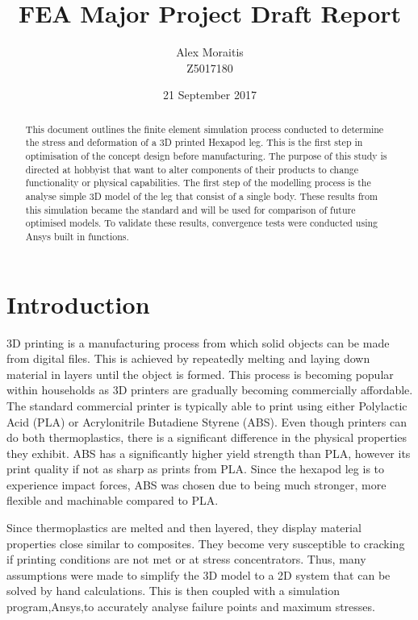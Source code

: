 \documentclass[a4paper]{article}
\title{FEA Major Project Draft Report}
\author{Alex Moraitis\\Z5017180}
\date{21 September 2017}
\begin{document}
\maketitle

\begin{abstract}
This document outlines the finite element simulation process conducted to determine the stress and deformation of a 3D printed Hexapod leg. This is the first step in optimisation of the concept design before manufacturing. The purpose of this study is directed at hobbyist that want to alter components of their products to change functionality or physical capabilities. The first step of the modelling process is the analyse simple 3D model of the leg that consist of a single body. These results from this simulation became the standard and will be used for comparison of future optimised models. To validate these results, convergence tests were conducted using Ansys built in functions.
\end{abstract}

\newpage
\tableofcontents
\newpage

\section{Introduction}
3D printing is a manufacturing process from which solid objects can be made from digital files. This is achieved by repeatedly melting and laying down material in layers until the object is formed. This process is becoming popular within households as 3D printers are gradually becoming commercially affordable. The standard commercial printer is typically able to print using either Polylactic Acid (PLA) or Acrylonitrile Butadiene Styrene (ABS). Even though printers can do both thermoplastics, there is a significant difference in the physical properties they exhibit. ABS has a  significantly higher yield strength than PLA, however its print quality if not as sharp as prints from PLA. Since the hexapod leg is to experience impact forces, ABS was chosen due to  being much stronger, more flexible and machinable compared to PLA.

Since thermoplastics are melted and then layered, they display material properties close similar to composites. They become very susceptible to cracking if printing conditions are not met or at stress concentrators. Thus, many assumptions were made to simplify the 3D model to a 2D system that can be solved by hand calculations. This is then coupled with a simulation program,Ansys,to accurately analyse failure points and maximum stresses.
\end{document}
